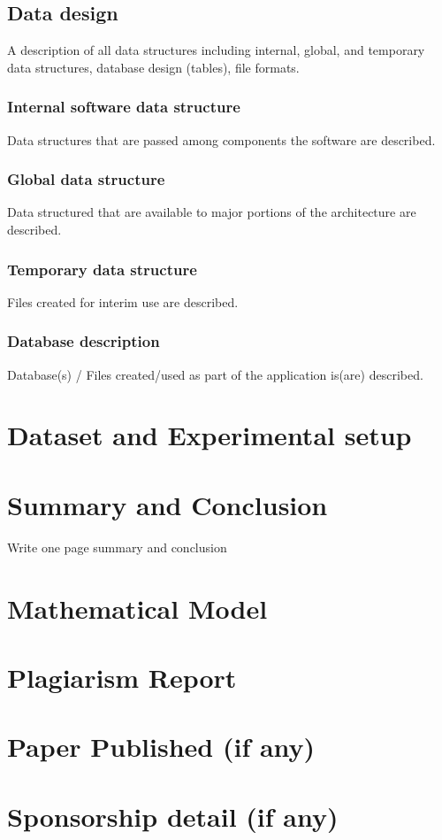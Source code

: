 \documentclass[oneside,a4paper,12pt]{report}
\begin{document}
\section{Data design }
A description of all data structures including internal, global, and temporary data structures, database design (tables), file formats.
\subsection{Internal software data structure}
Data structures that are passed among components the software are described.
\subsection{Global data structure}
Data structured that are available to major portions of the architecture are described.
\subsection{Temporary data structure}
Files created for interim use are described.
\subsection{Database description}
Database(s) / Files created/used  as part of the application is(are) described.

 \chapter{Dataset and Experimental setup}




 \chapter{Summary and Conclusion}
Write one page summary and conclusion




\begin{appendices}


\chapter{Mathematical Model}











\chapter{Plagiarism Report }


\chapter{Paper Published (if any)}

\chapter{Sponsorship detail (if any)}



\end{appendices}
\end{document}
